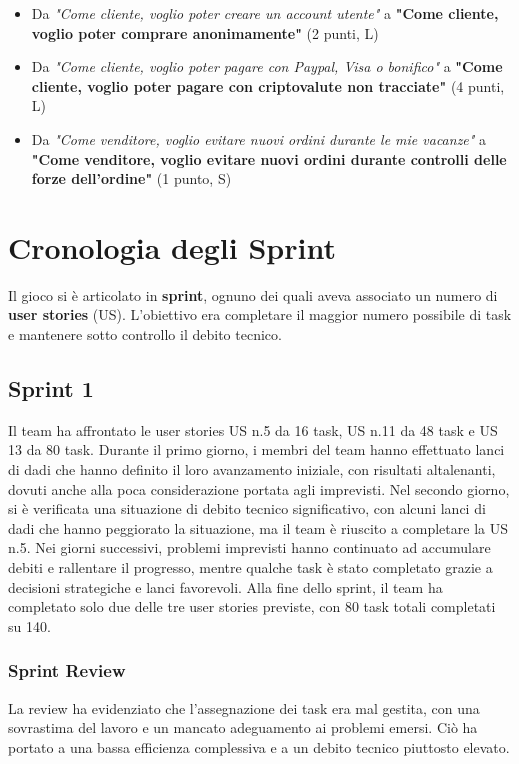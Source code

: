 \documentclass{article}
\begin{document}
\begin{itemize}
    \item Da \textit{"Come cliente, voglio poter creare un account utente"} a \textbf{"Come cliente, voglio poter comprare anonimamente"} (2 punti, L)
    \item Da \textit{"Come cliente, voglio poter pagare con Paypal, Visa o bonifico"} a \textbf{"Come cliente, voglio poter pagare con criptovalute non tracciate"} (4 punti, L)
    \item Da \textit{"Come venditore, voglio evitare nuovi ordini durante le mie vacanze"} a \textbf{"Come venditore, voglio evitare nuovi ordini durante controlli delle forze dell'ordine"} (1 punto, S)
\end{itemize}

\section*{Cronologia degli Sprint}

Il gioco si è articolato in \textbf{sprint}, ognuno dei quali aveva associato un numero di \textbf{user stories} (US). L'obiettivo era completare il maggior numero possibile di task e mantenere sotto controllo il debito tecnico.

\subsection*{Sprint 1}
Il team ha affrontato le user stories US n.5 da 16 task, US n.11 da 48 task e US 13 da 80 task. Durante il primo giorno, i membri del team hanno effettuato lanci di dadi che hanno definito il loro avanzamento iniziale, con risultati altalenanti, dovuti anche alla poca considerazione portata agli imprevisti. Nel secondo giorno, si è verificata una situazione di debito tecnico significativo, con alcuni lanci di dadi che hanno peggiorato la situazione, ma il team è riuscito a completare la US n.5. Nei giorni successivi, problemi imprevisti hanno continuato ad accumulare debiti e rallentare il progresso, mentre qualche task è stato completato grazie a decisioni strategiche e lanci favorevoli. Alla fine dello sprint, il team ha completato solo due delle tre user stories previste, con 80 task totali completati su 140. 

\subsubsection*{Sprint Review}  
La review ha evidenziato che l'assegnazione dei task era mal gestita, con una sovrastima del lavoro e un mancato adeguamento ai problemi emersi. Ciò ha portato a una bassa efficienza complessiva e a un debito tecnico piuttosto elevato.
\end{document}
